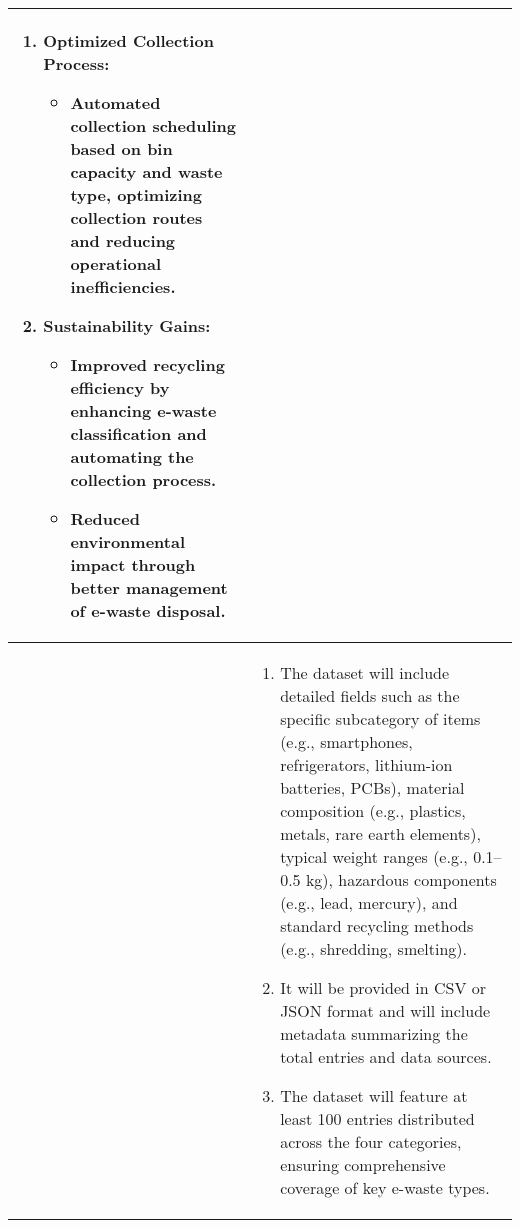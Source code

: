 \begin{table}[!htbp]
\begin{tabular}{p{}|p{}}
\begin{enumerate}
\begin{itemize}
			\end{itemize}
			\item \textbf{Optimized Collection Process:} \begin{itemize}
				\item Automated collection scheduling based on bin capacity and waste type, optimizing collection routes and reducing operational inefficiencies. 
			\end{itemize}
			\item \textbf{Sustainability Gains:}  \begin{itemize}
				\item Improved recycling efficiency by enhancing e-waste classification and automating the collection process. 
				\item Reduced environmental impact through better management of e-waste disposal. 
			\end{itemize}
		\end{enumerate} \\ \hline

		\Paste{SO1} & 
		\begin{enumerate}
		\item The dataset will include detailed fields such as the specific subcategory of items (e.g., smartphones, refrigerators, lithium-ion batteries, PCBs), material composition (e.g., plastics, metals, rare earth elements), typical weight ranges (e.g., 0.1–0.5 kg), hazardous components (e.g., lead, mercury), and standard recycling methods (e.g., shredding, smelting).
		\item It will be provided in CSV or JSON format and will include metadata summarizing the total entries and data sources. 
		\item The dataset will feature at least 100 entries distributed across the four categories, ensuring comprehensive coverage of key e-waste types.		
		\end{enumerate} 
        \\ \hline  
    \end{tabular}
\end{table}

